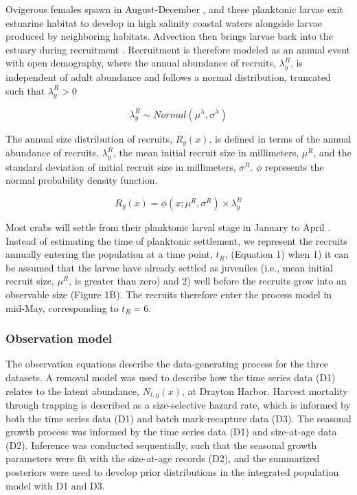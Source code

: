 \documentclass{article}
\begin{document}
Ovigerous females spawn in August-December \parencite{klassen2007biological}, and these planktonic larvae exit estuarine habitat to develop in high salinity coastal waters alongside larvae produced by neighboring habitats. Advection then brings larvae back into the estuary during recruitment \parencite{young2019life}. Recruitment is therefore modeled as an annual event with open demography, where the annual abundance of recruits, $\lambda^R_y$, is independent of adult abundance and follows a normal distribution, truncated such that $\lambda^R_y > 0$  

\begin{equation}
\lambda^R_y \sim Normal(\mu^{\lambda}, \sigma^{\lambda})
\end{equation}

The annual size distribution of recruits, $R_y(x)$, is defined in terms of the annual abundance of recruits, $\lambda^R_y$, the mean initial recruit size in millimeters, $\mu^R$, and the standard deviation of initial recruit size in millimeters, $\sigma^R$. $\phi$ represents the normal probability density function.

\begin{equation}
R_y(x) = \phi(x; \mu^R, \sigma^R) \times \lambda^R_y
\end{equation}

Most crabs will settle from their planktonic larval stage in January to April \parencite{yamada2005growth}. Instead of estimating the time of planktonic settlement, we represent the recruits annually entering the population at a time point, $t_R$, (Equation 1) when 1) it can be assumed that the larvae have already settled as juveniles (i.e., mean initial recruit size, $\mu^R$, is greater than zero) and 2) well before the recruits grow into an observable size (Figure 1B). The recruits therefore enter the process model in mid-May, corresponding to $t_R=6$. 

\subsubsection{Observation model}

The observation equations describe the data-generating process for the three datasets. A removal model was used to describe how the time series data (D1) relates to the latent abundance, $N_{t,y}(x)$, at Drayton Harbor. Harvest mortality through trapping is described as a size-selective hazard rate, which is informed by both the time series data (D1) and batch mark-recapture data (D3). The seasonal growth process was informed by the time series data (D1) and size-at-age data (D2). Inference was conducted sequentially, such that the seasonal growth parameters were fit with the size-at-age records (D2), and the summarized posteriors were used to develop prior distributions in the integrated population model with D1 and D3.
\end{document}
